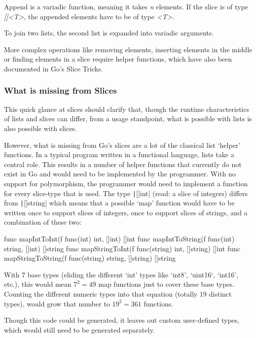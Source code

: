 Append is a variadic function, meaning it takes \textit{n} elements. If the slice is of type \textit{[]<T>},
the appended elements have to be of type \textit{<T>}.

To join two lists, the second list is expanded into
variadic arguments.

More complex operations like removing elements, inserting elements in the middle or finding
elements in a slice require helper functions, which have also been documented in Go's
Slice Tricks\autocite{slice-tricks}.

\subsubsection{What is missing from Slices}

This quick glance at slices should clarify that, though the runtime characteristics of lists and slices
can differ, from a usage standpoint, what is possible with lists is also possible with slices.

However, what is missing from Go's slices are a lot of the classical list `helper' functions. In a typical program written in a functional
language, lists take a central role. This results in a number of helper functions\autocite{haskell-list-funcs}
that currently do not exist in Go and would need to be implemented by the programmer.
With no support for polymorphism, the programmer would need to implement a function for every slice-type
that is used. The type \texttt|[]int| (read: a slice of integers) differs from \texttt|[]string|
which means that a possible `map' function would have to be
written once to support slices of integers, once to support slices of strings, and a combination of these two:

\begin{gocode}
func mapIntToInt(f func(int) int, []int) []int
func mapIntToString(f func(int) string, []int) []string
func mapStringToInt(f func(string) int, []string) []int
func mapStringToString(f func(string) string, []string) []string
\end{gocode}

With 7 base types (eliding the different `int' types like `int8', `uint16`, `int16', etc.), this would
mean $7^{2} = 49$ map functions just to cover these base types. Counting the different numeric
types into that equation (totally 19 distinct types\autocite{go-basetypes}), would grow that number to $19^{2} = 361$ functions.

Though this code could be generated, it leaves out custom user-defined types, which would still
need to be generated separately.

